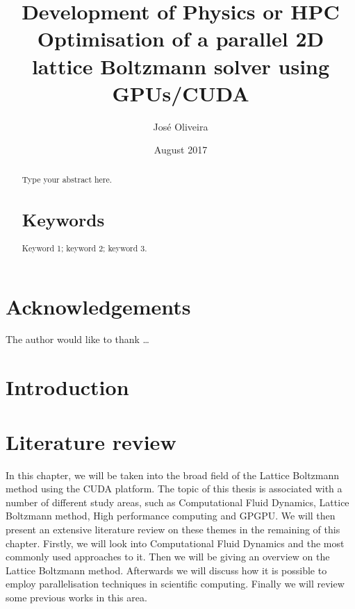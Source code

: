\documentclass[12pt]{book}
\title{Development of Physics or HPC Optimisation of a parallel 2D lattice Boltzmann solver using GPUs/CUDA}
\author{José Oliveira}
\date{August 2017}
\begin{document}
%
%

\frontmatter

\maketitle

\begin{abstract}
    Type your abstract here.
    \section*{Keywords}
    Keyword 1; keyword 2; keyword 3.
\end{abstract}

\sstableofcontents

\sslistoffigures

\sslistoftables

\begin{listofabbreviations}
\end{listofabbreviations}

\chapter{Acknowledgements}
The author would like to thank \dots

%
%
\mainmatter

\chapter{Introduction}

\chapter{Literature review}
In this chapter, we will be taken into the broad field of the Lattice Boltzmann method using the CUDA platform. The topic of this thesis is associated with a number of different study areas, such as Computational Fluid Dynamics, Lattice Boltzmann method, High performance computing and GPGPU. We will then present an extensive literature review on these themes in the remaining of this chapter. Firstly, we will look into Computational Fluid Dynamics and the most commonly used approaches to it. Then we will be giving an overview on the Lattice Boltzmann method. Afterwards we will discuss how it is possible to employ parallelisation techniques in scientific computing. Finally we will review some previous works in this area.
\end{document}
